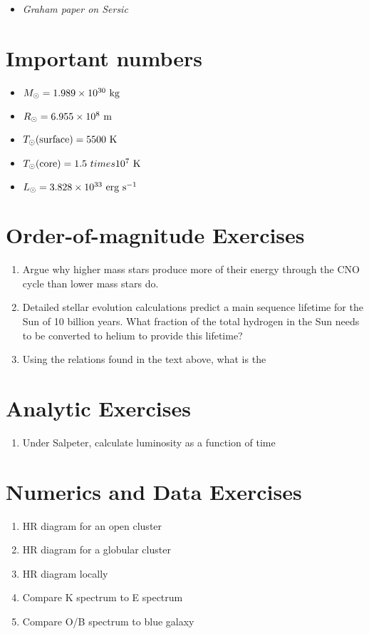 \begin{itemize}
  \item {\it Graham paper on Sersic}
\end{itemize}

\citet{gunn06a}

\section{Important numbers}

\begin{itemize}
\item $M_{\odot} = 1.989 \times 10^{30} {\rm ~kg} $
\item $R_{\odot} = 6.955 \times 10^{8} {\rm ~m} $
\item $T_{\odot}{\rm (surface)} = 5500 {\rm ~K} $
\item $T_{\odot}{\rm (core)} = 1.5 \ times 10^7 {\rm ~K} $
\item $L_{\odot} = 3.828 \times 10^{33} {\rm ~erg} {\rm ~s}^{-1}$
\end{itemize}

\section{Order-of-magnitude Exercises}

\begin{enumerate} 
\item Argue why higher mass stars produce more of their energy through
    the CNO cycle than lower mass stars do.
\item Detailed stellar evolution calculations predict a main sequence
    lifetime for the Sun of 10 billion years. What fraction of the
    total hydrogen in the Sun needs to be converted to helium to
    provide this lifetime?
\item Using the relations found in the text above, what is the 
\end{enumerate} 

\section{Analytic Exercises}

\begin{enumerate}
\item Under Salpeter, calculate luminosity as a function of time
\end{enumerate}

\section{Numerics and Data Exercises}

\begin{enumerate}
\item HR diagram for an open cluster
\item HR diagram for a globular cluster 
\item HR diagram locally
\item Compare K spectrum to E spectrum
\item Compare O/B spectrum to blue galaxy
\end{enumerate}


  
